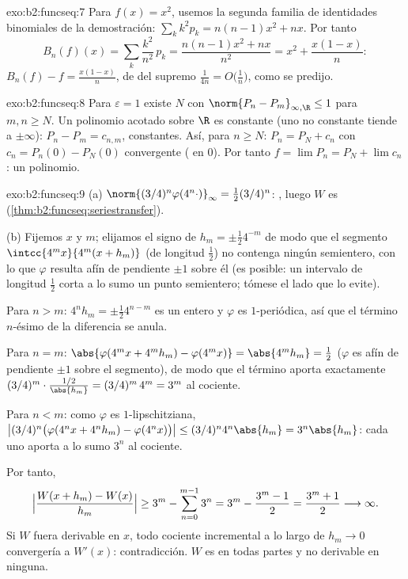 \begin{solution}{exo:b2:funcseq:7}
Para $f(x) = x^2$, usemos la segunda familia de identidades
binomiales de la demostración: $\sum_k k^2 p_k = n(n-1)x^2 + nx$.
Por tanto
\[
B_n(f)(x) = \sum_k \frac{k^2}{n^2}\,p_k
= \frac{n(n-1)x^2 + nx}{n^2}
= x^2 + \frac{x(1 - x)}{n} :
\]
$B_n(f) - f = \frac{x(1-x)}{n}$, de  del supremo $\frac{1}{4n}
= O\bigl(\frac1n\bigr)$, como se predijo.
\end{solution}

\begin{solution}{exo:b2:funcseq:8}
Para $\varepsilon = 1$ existe $N$ con $\norm{P_n - P_m}_{\infty,
\R} \leq 1$ para $m, n \geq N$. Un polinomio acotado sobre $\R$ es
constante (uno no constante tiende a $\pm\infty$): $P_n - P_m =
c_{n,m}$, constantes. Así, para $n \geq N$: $P_n = P_N + c_n$ con
$c_n = P_n(0) - P_N(0)$ convergente ( en $0$).
Por tanto $f = \lim P_n = P_N + \lim c_n$: un polinomio.
\end{solution}

\begin{solution}{exo:b2:funcseq:9}
(a) $\norm{(3/4)^n\varphi(4^n\cdot)}_\infty = \frac12 (3/4)^n$:
, luego $W$ es 
(\cref{thm:b2:funcseq:seriestransfer}).

(b) Fijemos $x$ y $m$; elijamos el signo de $h_m = \pm\frac12
4^{-m}$ de modo que el segmento $\intcc{4^mx}{4^m(x + h_m)}$ (de
longitud $\frac12$) no contenga ningún semientero, con lo que
$\varphi$ resulta afín de pendiente $\pm1$ sobre él (es posible: un
intervalo de longitud $\frac12$ corta a lo sumo un punto
semientero; tómese el lado que lo evite).

Para $n > m$: $4^n h_m = \pm\frac12 4^{n-m}$ es un entero y $\varphi$
es $1$-periódica, así que el término $n$-ésimo de la diferencia se
anula.

Para $n = m$: $\abs{\varphi(4^m x + 4^m h_m) - \varphi(4^m x)} =
\abs{4^m h_m} = \frac12$ ($\varphi$ es afín de pendiente $\pm 1$
sobre el segmento), de modo que el término aporta exactamente
$(3/4)^m \cdot \frac{1/2}{\abs{h_m}} = (3/4)^m\,4^m = 3^m$ al
cociente.

Para $n < m$: como $\varphi$ es $1$-lipschitziana,
$\bigl|(3/4)^n\bigl(\varphi(4^nx + 4^nh_m) -
\varphi(4^nx)\bigr)\bigr| \leq (3/4)^n 4^n\abs{h_m} =
3^n\abs{h_m}$: cada uno aporta a lo sumo $3^n$ al cociente.

Por tanto,
\[
\Bigl|\frac{W(x + h_m) - W(x)}{h_m}\Bigr|
\geq 3^m - \sum_{n=0}^{m-1} 3^n
= 3^m - \frac{3^m - 1}{2} = \frac{3^m + 1}{2}
\longrightarrow \infty .
\]
Si $W$ fuera derivable en $x$, todo cociente incremental a lo largo
de $h_m \to 0$ convergería a $W'(x)$: contradicción. $W$ es
 en todas partes y no derivable en ninguna.
\end{solution}

